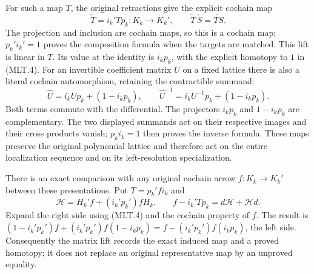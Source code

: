 For such a map \(T\), the original retractions
give the explicit cochain map
\[
 \widetilde T=i_k'Tp_k:K_k\longrightarrow K_k',
 \qquad
 \widetilde T\,\widetilde S=\widetilde{TS}.
                                                               \tag{MLT.20}
\]
The projection and inclusion are cochain maps,
so this is a cochain map; \(p_k'i_k'=1\)
proves the composition formula when the targets
are matched. This lift is linear in \(T\).
Its value at the identity is \(i_kp_k\), with
the explicit homotopy to \(1\) in (MLT.4).
For an invertible coefficient matrix \(U\)
on a fixed lattice there is also a literal
cochain automorphism, retaining the contractible
summand:
\[
 \widehat U=i_kUp_k+(1-i_kp_k),\qquad
 \widehat U^{-1}=i_kU^{-1}p_k+(1-i_kp_k).                 \tag{MLT.21}
\]
Both terms commute with the differential.
The projectors \(i_kp_k\) and \(1-i_kp_k\)
are complementary. The two displayed summands
act on their respective images and their
cross products vanish; \(p_ki_k=1\) then
proves the inverse formula. These maps preserve the
original polynomial lattice and therefore
act on the entire localization sequence and
on its left-resolution specialization.

There is an exact comparison with any original
cochain arrow \(f:K_k\to K_k'\) between these
presentations. Put \(T=p_k'f i_k\) and
\[
 \mathcal H=H_k'f+(i_k'p_k')fH_k.
 \qquad
 f-i_k'Tp_k=d\mathcal H+\mathcal H d.                    \tag{MLT.22}
\]
Expand the right side using (MLT.4) and the
cochain property of \(f\). The result is
\((1-i_k'p_k')f+(i_k'p_k')f(1-i_kp_k)
=f-(i_k'p_k')f(i_kp_k)\), the left side.
Consequently the matrix lift records the
exact induced map and a proved homotopy;
it does not replace an original representative
map by an unproved equality.

